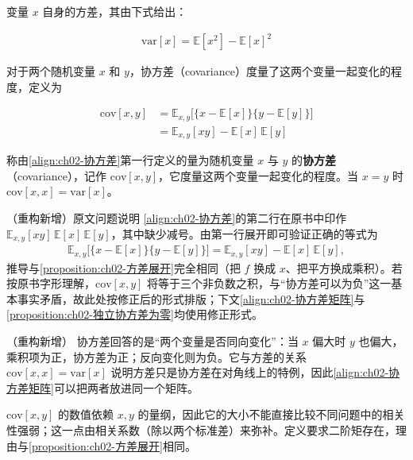 \documentclass[../../main.tex]{subfiles}
\begin{document}
变量 $x$ 自身的方差，其由下式给出：

\begin{align}
  \mathrm{var}[x] = \mathbb{E}\left[x^{2}\right] - \mathbb{E}[x]^{2}
  \label{align:ch02-变量方差}
\end{align}

对于两个随机变量 $x$ 和 $y$，协方差（covariance）度量了这两个变量一起变化的程度，定义为

\begin{align}
  \mathrm{cov}[x,y] &= \mathbb{E}_{x,y}\big[\{x-\mathbb{E}[x]\}\{y-\mathbb{E}[y]\}\big] \nonumber \\
  &= \mathbb{E}_{x,y}[xy] - \mathbb{E}[x]\,\mathbb{E}[y]
  \label{align:ch02-协方差}
\end{align}

\begin{definition}[协方差]\label{definition:ch02-协方差}
称由\eqref{align:ch02-协方差}第一行定义的量为随机变量 $x$ 与 $y$ 的\textbf{协方差}（covariance），记作 $\mathrm{cov}[x,y]$，它度量这两个变量一起变化的程度。当 $x=y$ 时 $\mathrm{cov}[x,x]=\mathrm{var}[x]$。
\end{definition}

\begin{remark}（重构新增）原文问题说明
\eqref{align:ch02-协方差}的第二行在原书中印作 $\mathbb{E}_{x,y}[xy]\,\mathbb{E}[x]\,\mathbb{E}[y]$，其中缺少减号。由第一行展开即可验证正确的等式为
\begin{align*}
  \mathbb{E}_{x,y}\big[\{x-\mathbb{E}[x]\}\{y-\mathbb{E}[y]\}\big]
  = \mathbb{E}_{x,y}[xy] - \mathbb{E}[x]\,\mathbb{E}[y] ,
\end{align*}
推导与\cref{proposition:ch02-方差展开}完全相同（把 $f$ 换成 $x$、把平方换成乘积）。若按原书字形理解，$\mathrm{cov}[x,y]$ 将等于三个非负数之积，与“协方差可以为负”这一基本事实矛盾，故此处按修正后的形式排版；下文\eqref{align:ch02-协方差矩阵}与\cref{proposition:ch02-独立协方差为零}均使用修正形式。
\end{remark}

\begin{remark}（重构新增）
协方差回答的是“两个变量是否同向变化”：当 $x$ 偏大时 $y$ 也偏大，乘积项为正，协方差为正；反向变化则为负。它与方差的关系 $\mathrm{cov}[x,x]=\mathrm{var}[x]$ 说明方差只是协方差在对角线上的特例，因此\eqref{align:ch02-协方差矩阵}可以把两者放进同一个矩阵。

$\mathrm{cov}[x,y]$ 的数值依赖 $x,y$ 的量纲，因此它的大小不能直接比较不同问题中的相关性强弱；这一点由相关系数（除以两个标准差）来弥补。定义要求二阶矩存在，理由与\cref{proposition:ch02-方差展开}相同。
\end{remark}
\end{document}
